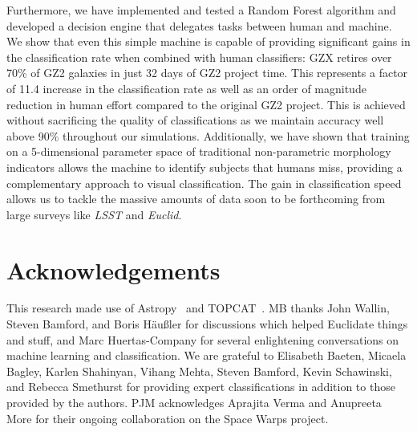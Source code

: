 \documentclass[twocolumn]{aastex6}
\begin{document}
Furthermore, we have implemented and tested a Random Forest algorithm 
and developed a decision engine that delegates tasks between human and 
machine.  We show that even this simple machine is capable of providing significant 
gains in the classification rate when combined with human classifiers: GZX
 retires over 70\% of GZ2 galaxies in just 32 days of GZ2 project time.  
This represents a factor of 11.4 increase in the classification rate as well as
 an order of magnitude reduction in human effort compared to the original GZ2 project. 
This is achieved without sacrificing the quality of classifications as we maintain 
accuracy well above 90\% throughout our simulations. 
Additionally, we have shown that training on a 5-dimensional parameter space of 
traditional non-parametric morphology indicators allows the machine to identify 
subjects that humans miss, providing  a complementary approach to visual classification. 
The gain in classification speed allows us to tackle the massive amounts of data soon
to be forthcoming from large surveys like \textit{LSST} and \textit{Euclid}.

\bigskip
\bigskip

\section*{Acknowledgements}

This research made use of Astropy~\citep{astropy} and TOPCAT~\citep{topcat}.
MB thanks John Wallin, Steven Bamford, and Boris H{\"a}u{\ss}ler for discussions which helped Euclidate things and stuff, and Marc Huertas-Company for several enlightening conversations on machine learning and classification. 
We are grateful to Elisabeth Baeten, Micaela Bagley, Karlen Shahinyan, Vihang Mehta, Steven Bamford, Kevin Schawinski, and Rebecca Smethurst for providing expert classifications in addition to those provided by the authors. PJM acknowledges Aprajita Verma and Anupreeta More for their ongoing collaboration on the Space Warps project. 
\end{document}
